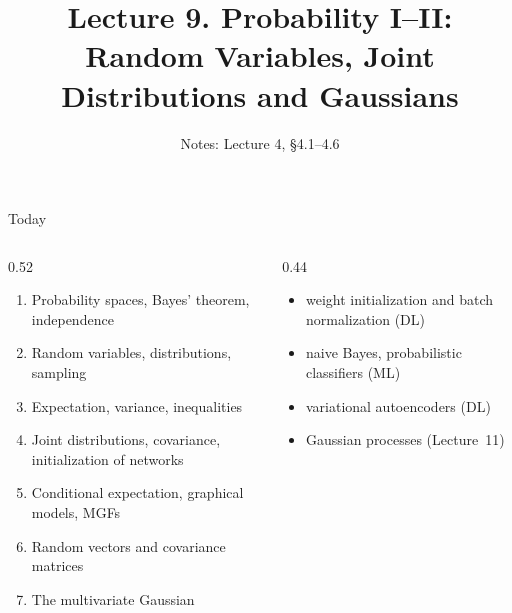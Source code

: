\documentclass[aspectratio=1610,11pt]{beamer}
\title[Lecture 9 · Probability I--II]{Lecture 9. Probability I--II:\\ Random Variables, Joint Distributions and Gaussians}
\subtitle{Notes: Lecture 4, \S4.1--4.6}
\begin{document}
\begin{frame}[plain]
    \titlepage
\end{frame}

\begin{frame}{Today}
    \begin{columns}[T]
        \begin{column}{0.52\linewidth}
            \begin{enumerate}\small
                \item Probability spaces, Bayes' theorem, independence
                \item Random variables, distributions, sampling
                \item Expectation, variance, inequalities
                \item Joint distributions, covariance, initialization of networks
                \item Conditional expectation, graphical models, MGFs
                \item Random vectors and covariance matrices
                \item The multivariate Gaussian
            \end{enumerate}
        \end{column}
        \begin{column}{0.44\linewidth}
            \begin{mlbox}[Used in]
                \small
                \begin{itemize}
                    \item weight initialization and batch normalization (DL)
                    \item naive Bayes, probabilistic classifiers (ML)
                    \item variational autoencoders (DL)
                    \item Gaussian processes (Lecture~11)
                \end{itemize}
            \end{mlbox}
        \end{column}
    \end{columns}
\end{frame}
\end{document}
